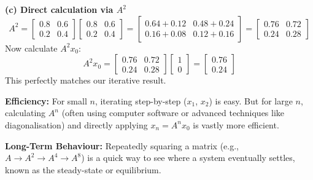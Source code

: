 \begin{solution}
\medskip
\textbf{(c) Direct calculation via $A^2$} \\
\[
A^2 = \begin{bmatrix} 0.8 & 0.6 \\ 0.2 & 0.4 \end{bmatrix} \begin{bmatrix} 0.8 & 0.6 \\ 0.2 & 0.4 \end{bmatrix} = \begin{bmatrix} 0.64+0.12 & 0.48+0.24 \\ 0.16+0.08 & 0.12+0.16 \end{bmatrix} = \begin{bmatrix} 0.76 & 0.72 \\ 0.24 & 0.28 \end{bmatrix}
\]
Now calculate $A^2 x_0$:
\[
A^2 x_0 = \begin{bmatrix} 0.76 & 0.72 \\ 0.24 & 0.28 \end{bmatrix} \begin{bmatrix} 1 \\ 0 \end{bmatrix} = \begin{bmatrix} 0.76 \\ 0.24 \end{bmatrix}
\]
This perfectly matches our iterative result.
\end{solution}

\begin{takeaways}
\item \textbf{Efficiency:} For small $n$, iterating step-by-step ($x_1$, $x_2$) is easy. But for large $n$, calculating $A^n$ (often using computer software or advanced techniques like diagonalisation) and directly applying $x_n = A^n x_0$ is vastly more efficient.
\item \textbf{Long-Term Behaviour:} Repeatedly squaring a matrix (e.g., $A \to A^2 \to A^4 \to A^8$) is a quick way to see where a system eventually settles, known as the steady-state or equilibrium.
\end{takeaways}
